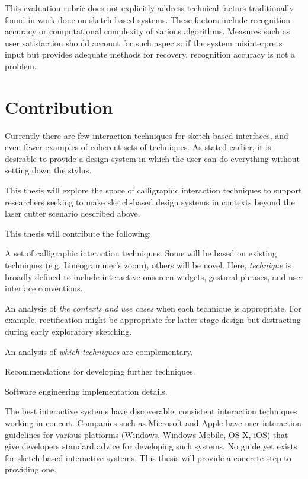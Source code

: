 \documentclass[12pt]{article}
\newenvironment{packed_enum}{
\begin{enumerate}
  \setlength{\itemsep}{1pt}
  \setlength{\parskip}{0pt}
  \setlength{\parsep}{0pt}
}{\end{enumerate}}
\begin{document}
This evaluation rubric does not explicitly address technical factors
traditionally found in work done on sketch based systems. These
factors include recognition accuracy or computational complexity of
various algorithms. Measures such as user satisfaction should account
for such aspects: if the system misinterprets input but provides
adequate methods for recovery, recognition accuracy is not a problem.

\section{Contribution}

Currently there are few interaction techniques for sketch-based
interfaces, and even fewer examples of coherent sets of techniques. As
stated earlier, it is desirable to provide a design system in which
the user can do everything without setting down the stylus.

This thesis will explore the space of calligraphic interaction
techniques to support researchers seeking to make sketch-based design
systems in contexts beyond the laser cutter scenario described above.

This thesis will contribute the following:
\begin{packed_enum}
\item A set of calligraphic interaction techniques. Some will be based
  on existing techniques (e.g. Lineogrammer's zoom), others will be
  novel. Here, \textit{technique} is broadly defined to include
  interactive onscreen widgets, gestural phrases, and user interface
  conventions.
\item An analysis of \textit{the contexts and use cases} when each
  technique is appropriate. For example, rectification might be
  appropriate for latter stage design but distracting during early
  exploratory sketching.
\item An analysis of \textit{which techniques} are complementary.
\item Recommendations for developing further techniques.
\item Software engineering implementation details.
\end{packed_enum}

The best interactive systems have discoverable, consistent interaction
techniques working in concert. Companies such as Microsoft and Apple
have user interaction guidelines for various platforms (Windows,
Windows Mobile, OS X, iOS) that give developers standard advice for
developing such systems. No guide yet exists for sketch-based
interactive systems. This thesis will provide a concrete step to
providing one.
\end{document}
